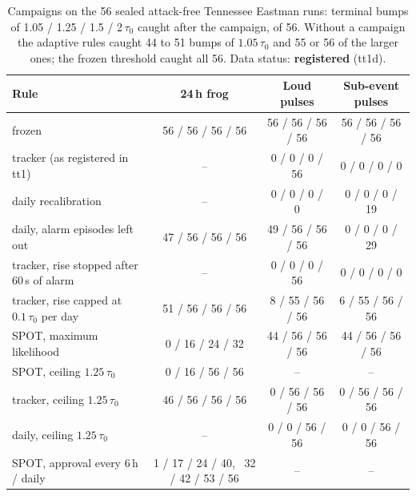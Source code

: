 \documentclass[sigconf,review,anonymous]{acmart}
\begin{document}
\begin{table}[t]
\caption{Campaigns on the 56 sealed attack-free Tennessee Eastman runs: terminal bumps of 1.05 / 1.25 /
1.5 / 2\,$\tau_0$ caught after the campaign, of 56. Without a campaign the adaptive rules caught 44 to 51
bumps of $1.05\,\tau_0$ and 55 or 56 of the larger ones; the frozen threshold caught all 56. Data
status: \textbf{registered} (tt1d).}
\label{tab:tepcampaigns}
\begin{tabularx}{\textwidth}{@{}Lccc@{}}
\toprule
Rule & 24\,h frog & Loud pulses & Sub-event pulses \\
\midrule
frozen & 56 / 56 / 56 / 56 & 56 / 56 / 56 / 56 & 56 / 56 / 56 / 56 \\
tracker (as registered in tt1) & -- & 0 / 0 / 0 / 56 & 0 / 0 / 0 / 0 \\
daily recalibration & -- & 0 / 0 / 0 / 0 & 0 / 0 / 0 / 19 \\
daily, alarm episodes left out & 47 / 56 / 56 / 56 & 49 / 56 / 56 / 56 & 0 / 0 / 0 / 29 \\
tracker, rise stopped after 60\,s of alarm & -- & 0 / 0 / 0 / 56 & 0 / 0 / 0 / 0 \\
tracker, rise capped at $0.1\,\tau_0$ per day & 51 / 56 / 56 / 56 & 8 / 55 / 56 / 56 & 6 / 55 / 56 / 56 \\
SPOT, maximum likelihood & 0 / 16 / 24 / 32 & 44 / 56 / 56 / 56 & 44 / 56 / 56 / 56 \\
SPOT, ceiling $1.25\,\tau_0$ & 0 / 16 / 56 / 56 & -- & -- \\
tracker, ceiling $1.25\,\tau_0$ & 46 / 56 / 56 / 56 & 0 / 56 / 56 / 56 & 0 / 56 / 56 / 56 \\
daily, ceiling $1.25\,\tau_0$ & -- & 0 / 0 / 56 / 56 & 0 / 0 / 56 / 56 \\
SPOT, approval every 6\,h / daily & 1 / 17 / 24 / 40, \ 32 / 42 / 53 / 56 & -- & -- \\
\bottomrule
\end{tabularx}
\end{table}
\end{document}
